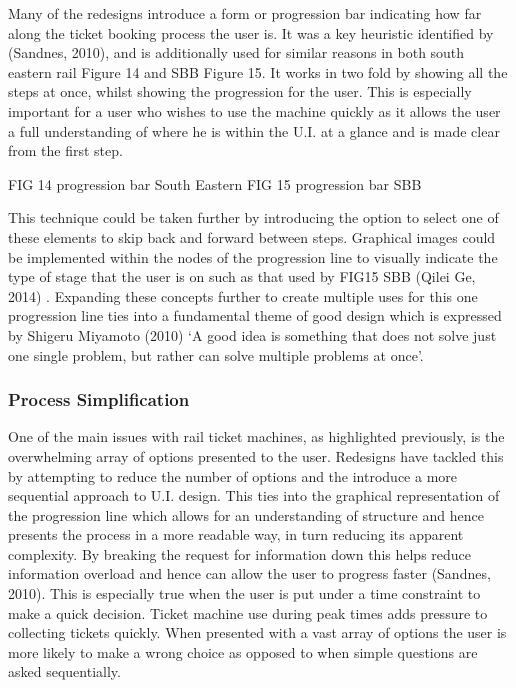 Many of the redesigns introduce a form or progression bar indicating how far along the ticket booking process the user is. It was a key heuristic identified by (Sandnes, 2010), and is additionally used for similar reasons in both south eastern rail Figure 14 and SBB Figure 15. It works in two fold by showing all the steps at once, whilst showing the progression for the user. This is especially important for a user who wishes to use the machine quickly as it allows the user a full understanding of where he is within the U.I. at a glance and is made clear from the first step.

FIG 14 progression bar South Eastern	FIG 15 progression bar SBB	
	
This technique could be taken further by introducing the option to select one of these elements to skip back and forward between steps. Graphical images could be implemented within the nodes of the progression line to visually indicate the type of stage that the user is on such as that used by FIG15 SBB (Qilei Ge, 2014) . Expanding these concepts further to create multiple uses for this one progression line ties into a fundamental theme of good design which is expressed by Shigeru Miyamoto (2010) ‘A good idea is something that does not solve just one single problem, but rather can solve multiple problems at once’.



\subsubsection{Process Simplification}
One of the main issues with rail ticket machines, as highlighted previously, is the overwhelming array of options presented to the user. Redesigns have tackled this by attempting to reduce the number of options and the introduce a more sequential approach to U.I. design. This ties into the graphical representation of the progression line which allows for an understanding of structure and hence presents the process in a more readable way, in turn reducing its apparent complexity. By breaking the request for information down this helps reduce information overload and hence can allow the user to progress faster  (Sandnes, 2010). This is especially true when the user is put under a time constraint to make a quick decision. Ticket machine use during peak times adds pressure to collecting tickets quickly. When presented with a vast array of options the user is more likely to make a wrong choice as opposed to when simple questions are asked sequentially.

